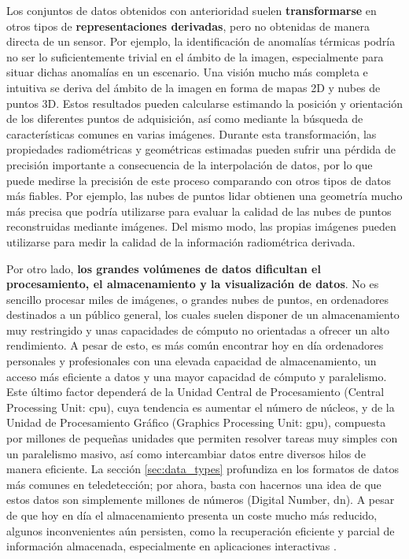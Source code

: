 Los conjuntos de datos obtenidos con anterioridad suelen \textbf{transformarse} en otros tipos de \textbf{representaciones derivadas}, pero no obtenidas de manera directa de un sensor. Por ejemplo, la identificación de anomalías térmicas podría no ser lo suficientemente trivial en el ámbito de la imagen, especialmente para situar dichas anomalías en un escenario. Una visión mucho más completa e intuitiva se deriva del ámbito de la imagen en forma de mapas 2D y nubes de puntos 3D. Estos resultados pueden calcularse estimando la posición y orientación de los diferentes puntos de adquisición, así como mediante la búsqueda de características comunes en varias imágenes. Durante esta transformación, las propiedades radiométricas y geométricas estimadas pueden sufrir una pérdida de precisión importante a consecuencia de la interpolación de datos, por lo que puede medirse la precisión de este proceso comparando con otros tipos de datos más fiables. Por ejemplo, las nubes de puntos \acrshort{lidar} obtienen una geometría mucho más precisa que podría utilizarse para evaluar la calidad de las nubes de puntos reconstruidas mediante imágenes. Del mismo modo, las propias imágenes pueden utilizarse para medir la calidad de la información radiométrica derivada.   

Por otro lado, \textbf{los grandes volúmenes de datos dificultan el procesamiento, el almacenamiento y la visualización de datos}. No es sencillo procesar miles de imágenes, o grandes nubes de puntos, en ordenadores destinados a un público general, los cuales suelen disponer de un almacenamiento muy restringido y unas capacidades de cómputo no orientadas a ofrecer un alto rendimiento. A pesar de esto, es más común encontrar hoy en día ordenadores personales y profesionales con una elevada capacidad de almacenamiento, un acceso más eficiente a datos y una mayor capacidad de cómputo y paralelismo. Este último factor dependerá de la Unidad Central de Procesamiento (Central Processing Unit: \acrshort{cpu}), cuya tendencia es aumentar el número de núcleos, y de la Unidad de Procesamiento Gráfico (Graphics Processing Unit: \acrshort{gpu}), compuesta por millones de pequeñas unidades que permiten resolver tareas muy simples con un paralelismo masivo, así como intercambiar datos entre diversos hilos de manera eficiente. La sección \ref{sec:data_types} profundiza en los formatos de datos más comunes en teledetección; por ahora, basta con hacernos una idea de que estos datos son simplemente millones de números (Digital Number, \acrshort{dn}). A pesar de que hoy en día el almacenamiento presenta un coste mucho más reducido, algunos inconvenientes aún persisten, como la recuperación eficiente y parcial de información almacenada, especialmente en aplicaciones interactivas \cite{bejar-martos_strategies_2022, ogayar-anguita_nested_2023}. 

